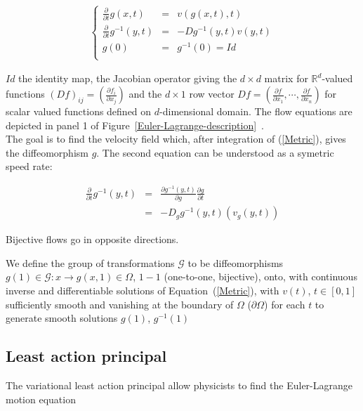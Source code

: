 \documentclass[final, paper=letter,5p,times,twocolumn]{elsarticle}
\theoremstyle{definition}
\begin{document}
\begin{eqnarray}
\left \lbrace
\begin{array}{rcl}
\frac{\partial}{\partial t}g(x,t) &=& v(g(x,t),t) \\
\frac{\partial}{\partial t}g^{-1}(y,t) &=& -Dg^{-1}(y,t)v(y,t) \\
g(0) &=& g^{-1}(0) = Id \\
\end{array}
\right .
\label{Metric}
\end{eqnarray}

$Id$ the identity map, the Jacobian operator giving the $d \times d$ matrix for $\mathbb{R}^{d}$-valued functions $(Df)_{ij} = (\frac{\partial f_{i}}{\partial x_{j}})$ and the $d \times 1$ row vector $Df = (\frac{\partial f}{\partial x_{1}}, \cdots, \frac{\partial f}{\partial x_{n}} )$ for scalar valued functions defined on $d$-dimensional domain. The flow equations are depicted in panel 1 of Figure~\ref{Euler-Lagrange-description}~\cite{pmid12117763}.\\
The goal is to find the velocity field which, after integration of (\ref{Metric}), gives the diffeomorphism $g$. The second equation can be understood as a symetric speed rate:

\begin{eqnarray*}
\frac{\partial}{\partial t}g^{-1}(y,t) & = & \frac{\partial g^{-1}(y,t)}{\partial g}\frac{\partial g}{\partial t} \\
& = & - D_{g} g^{-1}(y,t) (v_{g}(y,t))
\end{eqnarray*}

Bijective flows go in opposite directions.

\begin{definition}
We define the group of transformations $\mathcal{G}$ to be diffeomorphisms $g(1) \in \mathcal{G}: x \rightarrow g(x, 1) \in \Omega$, $1-1$ (one-to-one, bijective), onto, with continuous inverse and differentiable solutions of Equation~(\ref{Metric}), with $v(t)$, $t \in [0, 1]$ sufficiently smooth and vanishing at the boundary of $\Omega$ ($\partial \Omega$) for each $t$ to generate smooth solutions $g(1)$, $g^{-1}(1)$
\end{definition}

\subsection{Least action principal}

The variational least action principal allow physicists to find the Euler-Lagrange motion equation
\end{document}
